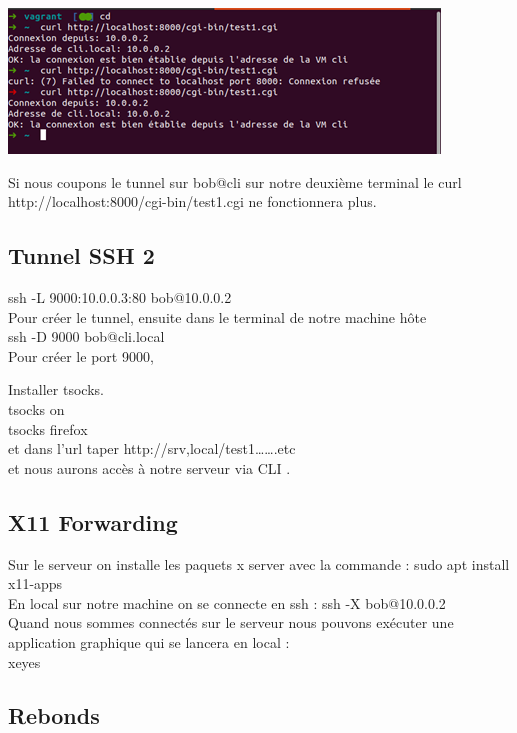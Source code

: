 \documentclass{article}
\begin{document}
\begin{center}
\includegraphics[]{image/curl.png}
\end{center}

Si nous coupons le tunnel sur bob@cli sur notre deuxième terminal le curl http://localhost:8000/cgi-bin/test1.cgi ne fonctionnera plus.

\subsection{Tunnel SSH 2}

\noindent ssh -L 9000:10.0.0.3:80 bob@10.0.0.2 
\\
Pour créer le tunnel, ensuite dans le terminal de notre machine hôte 
\\
ssh -D 9000 bob@cli.local 
\\
Pour créer le port 9000,

\noindent Installer tsocks.
\\
tsocks on
\\
tsocks firefox
\\
et dans l’url taper http://srv,local/test1…….etc
\\
et nous aurons accès à notre serveur via CLI .


\subsection{X11 Forwarding}

\noindent Sur le serveur on installe les paquets x server avec la commande : sudo apt install x11-apps
\\
En local sur notre machine on se connecte en ssh : ssh -X bob@10.0.0.2
\\
Quand nous sommes connectés sur le serveur nous pouvons exécuter une application graphique qui se lancera en local : 
\\
xeyes



\subsection{Rebonds}
\end{document}
